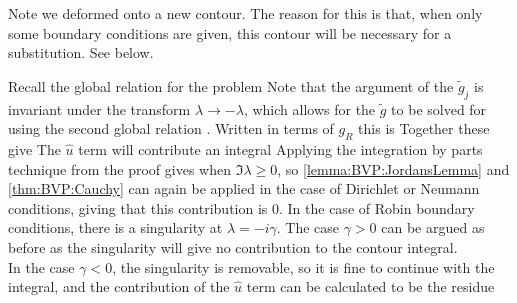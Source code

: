 \documentclass{article}
\begin{document}
\begin{idea}
Note we deformed onto a new contour. The reason for this is that, when only some boundary conditions are given, this contour will be necessary for a substitution. See below. 
\end{idea}
Recall the global relation for the problem
Note that the argument of the $\tilde{g}_j$ is invariant under the transform $\lambda \to -\lambda$, which allows for the $\tilde{g}$ to be solved for using the second global relation 
. Written in terms of $g_R$ this is
Together these give 
The $\hat{u}$ term will contribute an integral 
Applying the integration by parts technique from the proof gives 
when $\Im \lambda \geq 0$, so \ref{lemma:BVP:JordansLemma} and \ref{thm:BVP:Cauchy} can again be applied in the case of Dirichlet or Neumann conditions, giving that this contribution is 0. In the case of Robin boundary conditions, there is a singularity at $\lambda = -i\gamma$. The case $\gamma > 0$ can be argued as before as the singularity will give no contribution to the contour integral. \\
In the case $\gamma <0$, the singularity is removable, so it is fine to continue with the integral, and the contribution of the $\hat{u}$ term can be calculated to be the residue
\end{document}
